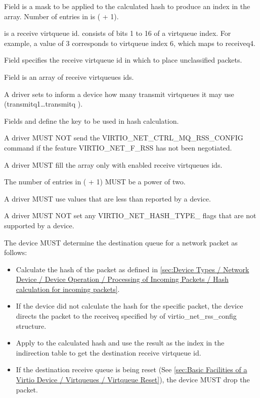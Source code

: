 Field  is a mask to be applied to
the calculated hash to produce an index in the
 array.
Number of entries in  is ( + 1).

 is a receive virtqueue id. 
consists of bits 1 to 16 of a virtqueue index. For example, a
 value of 3 corresponds to virtqueue index 6,
which maps to receiveq4.

Field  specifies the receive virtqueue id in which to
place unclassified packets.

Field  is an array of receive virtqueues ids.

A driver sets  to inform a device how many transmit virtqueues it may use (transmitq1\ldots transmitq ).

Fields  and  define the key to be used in hash calculation.


A driver MUST NOT send the VIRTIO_NET_CTRL_MQ_RSS_CONFIG command if the feature VIRTIO_NET_F_RSS has not been negotiated.

A driver MUST fill the  array only with
enabled receive virtqueues ids.

The number of entries in  ( + 1) MUST be a power of two.

A driver MUST use  values that are less than  reported by a device.

A driver MUST NOT set any VIRTIO_NET_HASH_TYPE_ flags that are not supported by a device.

The device MUST determine the destination queue for a network packet as follows:
\begin{itemize}
\item Calculate the hash of the packet as defined in \ref{sec:Device Types / Network Device / Device Operation / Processing of Incoming Packets / Hash calculation for incoming packets}.
\item If the device did not calculate the hash for the specific packet, the device directs the packet to the receiveq specified by  of virtio_net_rss_config structure.
\item Apply  to the calculated hash
and use the result as the index in the indirection table to get
the destination receive virtqueue id.
\item If the destination receive queue is being reset (See \ref{sec:Basic Facilities of a Virtio Device / Virtqueues / Virtqueue Reset}), the device MUST drop the packet.
\end{itemize}

